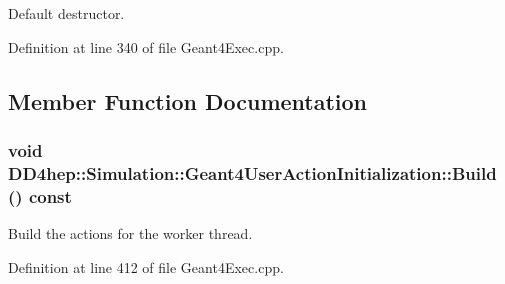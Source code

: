 Default destructor. 

Definition at line 340 of file Geant4Exec.cpp.

\subsection{Member Function Documentation}
\hypertarget{class_d_d4hep_1_1_simulation_1_1_geant4_user_action_initialization_ab3d53de87035e93453c2eebaea1ec2a0}{
\subsubsection[{Build}]{\setlength{\rightskip}{0pt plus 5cm}void DD4hep::Simulation::Geant4UserActionInitialization::Build () const}}
\label{class_d_d4hep_1_1_simulation_1_1_geant4_user_action_initialization_ab3d53de87035e93453c2eebaea1ec2a0}


Build the actions for the worker thread. 

Definition at line 412 of file Geant4Exec.cpp.

